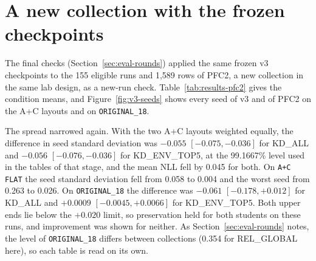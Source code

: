 \section{A new collection with the frozen checkpoints}
\label{sec:results-pfc2}

The final checks (Section~\ref{sec:eval-rounds}) applied the same frozen
v3 checkpoints to the 155 eligible runs and 1,589 rows of PFC2, a new
collection in the same lab design, as a new-run check.
Table~\ref{tab:results-pfc2} gives the condition means, and
Figure~\ref{fig:v3-seeds} shows every seed of v3 and of PFC2 on the
A+C layouts and on \texttt{ORIGINAL\_18}.

The spread narrowed again. With the two A+C layouts weighted equally,
the difference in seed standard deviation was $-0.055$
$[-0.075, -0.036]$ for KD\_ALL and $-0.056$ $[-0.076, -0.036]$ for
KD\_ENV\_TOP5, at the 99.1667\% level used in the tables of that stage,
and the mean NLL fell by 0.045 for both. On \texttt{A+C FLAT} the seed
standard deviation fell from 0.058 to 0.004 and the worst seed from
0.263 to 0.026. On \texttt{ORIGINAL\_18} the difference was $-0.061$
$[-0.178, +0.012]$ for KD\_ALL and $+0.0009$ $[-0.0045, +0.0066]$ for
KD\_ENV\_TOP5. Both upper ends lie below the $+0.020$ limit, so
preservation held for both students on these runs, and improvement was
shown for neither. As Section~\ref{sec:eval-rounds} notes, the level
of \texttt{ORIGINAL\_18} differs between collections (0.354 for
REL\_GLOBAL here), so each table is read on its own.

